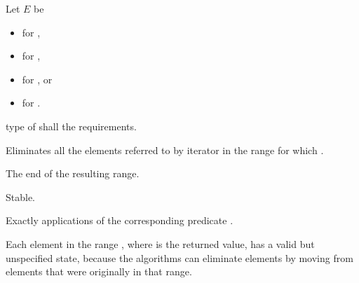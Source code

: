 \begin{itemdescr}
\begin{addedblock}
\pnum
Let $E$ be
\begin{itemize}
\item {} for ,
\item {} for ,
\item {} for , or
\item {} for .
\end{itemize}
\end{addedblock}

\pnum
\requires
{} type of
 shall  the
 requirements.

\pnum
\effects
Eliminates all the elements referred to by iterator
in the range 
for which  .

\pnum
\returns
The end of the resulting range.

\pnum
\remarks Stable.

\pnum
\complexity
Exactly
applications of the corresponding predicate .

\pnum
\begin{note}
Each element in the range , where  is
the returned value, has a valid but unspecified state, because the algorithms
can eliminate elements by moving from elements that were originally
in that range.
\end{note}
\end{itemdescr}


